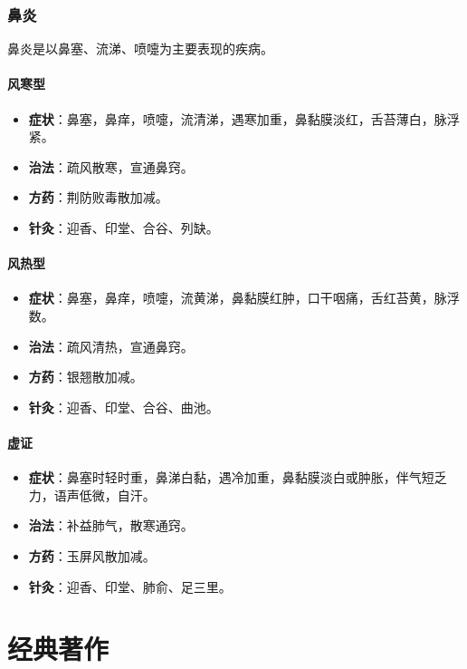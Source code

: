 \documentclass[12pt,UTF8]{ctexbook}
\begin{document}
\subsection{鼻炎}

鼻炎是以鼻塞、流涕、喷嚏为主要表现的疾病。

\subsubsection{风寒型}

\begin{itemize}
\item \textbf{症状}：鼻塞，鼻痒，喷嚏，流清涕，遇寒加重，鼻黏膜淡红，舌苔薄白，脉浮紧。
\item \textbf{治法}：疏风散寒，宣通鼻窍。
\item \textbf{方药}：荆防败毒散加减。
\item \textbf{针灸}：迎香、印堂、合谷、列缺。
\end{itemize}

\subsubsection{风热型}

\begin{itemize}
\item \textbf{症状}：鼻塞，鼻痒，喷嚏，流黄涕，鼻黏膜红肿，口干咽痛，舌红苔黄，脉浮数。
\item \textbf{治法}：疏风清热，宣通鼻窍。
\item \textbf{方药}：银翘散加减。
\item \textbf{针灸}：迎香、印堂、合谷、曲池。
\end{itemize}

\subsubsection{虚证}

\begin{itemize}
\item \textbf{症状}：鼻塞时轻时重，鼻涕白黏，遇冷加重，鼻黏膜淡白或肿胀，伴气短乏力，语声低微，自汗。
\item \textbf{治法}：补益肺气，散寒通窍。
\item \textbf{方药}：玉屏风散加减。
\item \textbf{针灸}：迎香、印堂、肺俞、足三里。
\end{itemize}

\chapter{经典著作}
\end{document}
